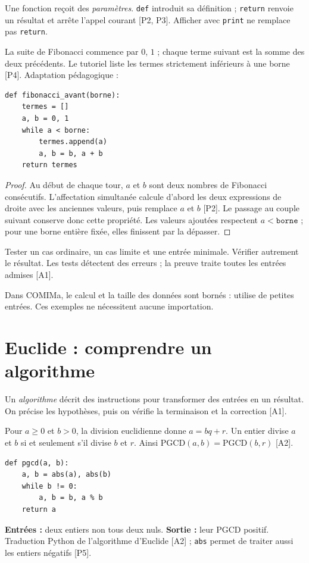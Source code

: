 \documentclass[11pt]{article}
\begin{document}
Une fonction reçoit des \emph{paramètres}. \texttt{def} introduit sa définition ; \texttt{return} renvoie un résultat et arrête l'appel courant [P2, P3]. Afficher avec \texttt{print} ne remplace pas \texttt{return}.

\begin{exemple}
La suite de Fibonacci commence par $0$, $1$ ; chaque terme suivant est la somme des deux précédents. Le tutoriel liste les termes strictement inférieurs à une borne [P4]. Adaptation pédagogique :
\end{exemple}
\begin{verbatim}
def fibonacci_avant(borne):
    termes = []
    a, b = 0, 1
    while a < borne:
        termes.append(a)
        a, b = b, a + b
    return termes
\end{verbatim}
\begin{proof}
Au début de chaque tour, $a$ et $b$ sont deux nombres de Fibonacci consécutifs. L'affectation simultanée calcule d'abord les deux expressions de droite avec les anciennes valeurs, puis remplace $a$ et $b$ [P2]. Le passage au couple suivant conserve donc cette propriété. Les valeurs ajoutées respectent $a<\texttt{borne}$ ; pour une borne entière fixée, elles finissent par la dépasser.
\end{proof}

\begin{methode}
Tester un cas ordinaire, un cas limite et une entrée minimale. Vérifier autrement le résultat. Les tests détectent des erreurs ; la preuve traite toutes les entrées admises [A1].
\end{methode}
Dans COMIMa, le calcul et la taille des données sont bornés : utilise de petites entrées. Ces exemples ne nécessitent aucune importation.

\section{Euclide : comprendre un algorithme}\label{sec:euclide}
\begin{definition}
Un \emph{algorithme} décrit des instructions pour transformer des entrées en un résultat. On précise les hypothèses, puis on vérifie la terminaison et la correction [A1].
\end{definition}
Pour $a\ge0$ et $b>0$, la division euclidienne donne $a=bq+r$. Un entier divise $a$ et $b$ si et seulement s'il divise $b$ et $r$. Ainsi $\mathrm{PGCD}(a,b)=\mathrm{PGCD}(b,r)$ [A2].
\begin{verbatim}
def pgcd(a, b):
    a, b = abs(a), abs(b)
    while b != 0:
        a, b = b, a % b
    return a
\end{verbatim}
\textbf{Entrées :} deux entiers non tous deux nuls. \textbf{Sortie :} leur PGCD positif. Traduction Python de l'algorithme d'Euclide [A2] ; \texttt{abs} permet de traiter aussi les entiers négatifs [P5].
\end{document}
